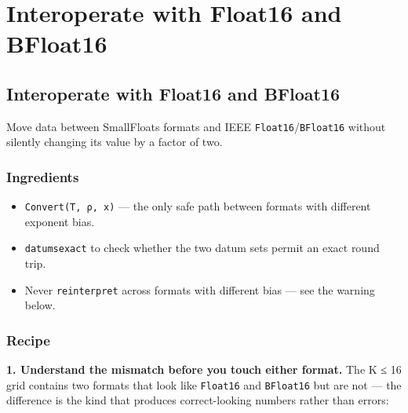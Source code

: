 \chapter{Interoperate with Float16 and BFloat16}


\section{Interoperate with Float16 and BFloat16}



\label{4242777158209694807}{}


Move data between SmallFloats formats and IEEE \texttt{Float16}/\allowbreak\texttt{BFloat16} without silently changing its value by a factor of two.



\subsection{Ingredients}



\label{13776634711169142479-dup3}{}


\begin{itemize}
\item \texttt{Convert(T, ρ, x)} — the only safe path between formats with different exponent bias.


\item \texttt{datumsexact} to check whether the two datum sets permit an exact round trip.


\item Never \texttt{reinterpret} across formats with different bias — see the warning below.

\end{itemize}


\subsection{Recipe}



\label{111379208343275940-dup3}{}


\textbf{1. Understand the mismatch before you touch either format.} The K ≤ 16 grid contains two formats that look like \texttt{Float16} and \texttt{BFloat16} but are not — the difference is the kind that produces correct-looking numbers rather than errors:




